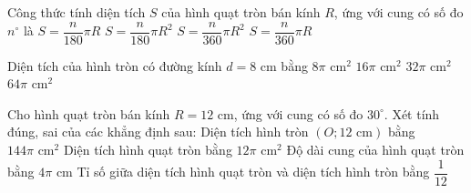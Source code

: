 \begin{ex}%
	Công thức tính diện tích $S$ của hình quạt tròn bán kính $R$, ứng với cung có số đo $n^\circ$ là
	\choice
	{$S = \dfrac{n}{180}\pi R$}
	{$S = \dfrac{n}{180}\pi R^2$}
	{\True $S = \dfrac{n}{360}\pi R^2$}
	{$S = \dfrac{n}{360}\pi R$}
\end{ex}

\begin{ex}%
	Diện tích của hình tròn có đường kính $d = 8\text{ cm}$ bằng
	\choice
	{$8\pi\text{ cm}^2$}
	{\True $16\pi\text{ cm}^2$}
	{$32\pi\text{ cm}^2$}
	{$64\pi\text{ cm}^2$}
\end{ex}

\begin{ex}%
	Cho hình quạt tròn bán kính $R = 12\text{ cm}$, ứng với cung có số đo $30^\circ$. Xét tính đúng, sai của các khẳng định sau:
	\choiceTF
	{\True Diện tích hình tròn $(O; 12\text{ cm})$ bằng $144\pi\text{ cm}^2$}
	{\True Diện tích hình quạt tròn bằng $12\pi\text{ cm}^2$}
	{Độ dài cung của hình quạt tròn bằng $4\pi\text{ cm}$}
	{\True Tỉ số giữa diện tích hình quạt tròn và diện tích hình tròn bằng $\dfrac{1}{12}$}
\end{ex}

